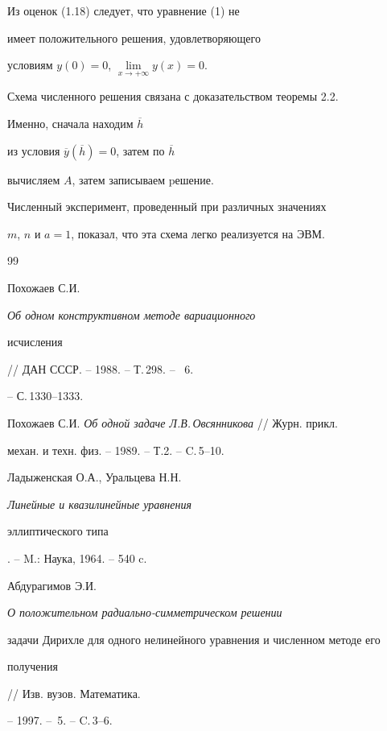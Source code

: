 \begin{notenonum} Из оценок (1.18) следует, что уравнение (1) не


имеет положительного решения, удовлетворяющего 


условиям $y(0) = 0$, $\lim\limits_{x\to+\infty}y(x) = 0$.


\end{notenonum}





Схема численного решения связана с доказательством теоремы 2.2.


Именно, сначала находим $ \overline h $ 


из условия $ \overline y(\overline h)=0 $, затем по $ \overline h $


вычисляем $A$, затем записываем pешение.


Численный эксперимент, проведенный при различных значениях


$m$, $n$ и $a = 1$, показал, что эта схема легко реализуется на ЭВМ.





\begin{thebibliography}{99}







Похожаев С.И. {\em Об одном конструктивном методе вариационного 


исчисления} // ДАН СССР. -- 1988. -- Т.\,298. -- \No\, 6.


-- С.\,1330--1333.




Похожаев С.И. {\em Об одной задаче Л.В.\,Овсянникова} // Журн. прикл.


механ. и техн. физ. -- 1989. -- Т.2. -- C.\,5--10.




Ладыженская О.А., Уральцева Н.Н. {\em Линейные и квазилинейные уравнения


эллиптического типа}. -- M.: Наука, 1964. -- 540 c.




Абдурагимов Э.И. {\em О положительном радиально-симметрическом решении


задачи Дирихле для одного нелинейного уравнения и численном методе его


получения} // Изв. вузов. Математика.


-- 1997. -- \No\,5. -- C.\,3--6.





\end{thebibliography}





\vskip 2cm











\label{end}





